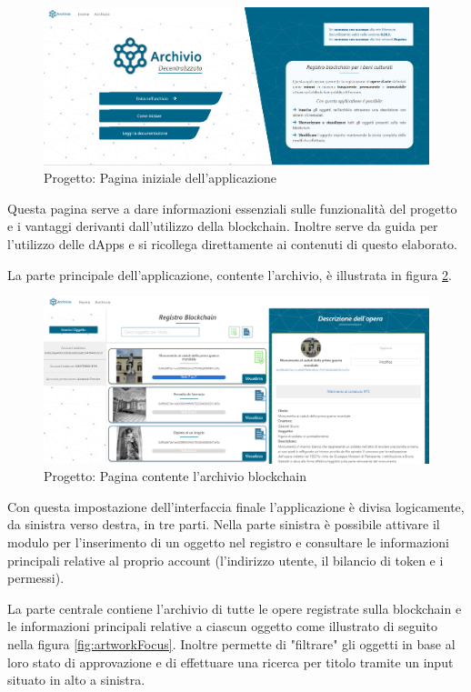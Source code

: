 \begin{figure}[H]
\centering
\includegraphics[width=1\textwidth]{immagini/prova3Index.PNG}
\caption{Progetto: Pagina iniziale dell'applicazione}
\label{fig:indexApp}
\end{figure}

Questa pagina serve a dare informazioni essenziali sulle funzionalità del progetto e i vantaggi derivanti dall'utilizzo della blockchain. Inoltre serve da guida per l'utilizzo delle dApps e si ricollega direttamente ai contenuti di questo elaborato.

La parte principale dell'applicazione, contente l'archivio, è illustrata in figura \ref{fig:artworkApp}.

\begin{figure}[H]
\centering
\includegraphics[width=1\textwidth]{immagini/artwork3Prova.PNG}
\caption{Progetto: Pagina contente l'archivio blockchain}
\label{fig:artworkApp}
\end{figure}

Con questa impostazione dell'interfaccia finale l'applicazione è divisa logicamente, da sinistra verso destra, in tre parti. Nella parte sinistra è possibile attivare il modulo per l'inserimento di un oggetto nel registro e consultare le informazioni principali relative al proprio account (l'indirizzo utente, il bilancio di token e i permessi). 

La parte centrale contiene l'archivio di tutte le opere registrate sulla blockchain e le informazioni principali relative a ciascun oggetto come illustrato di seguito nella figura \ref{fig:artworkFocus}. Inoltre permette di "filtrare" gli oggetti in base al loro stato di approvazione e di effettuare una ricerca per titolo tramite un input situato in alto a sinistra.

